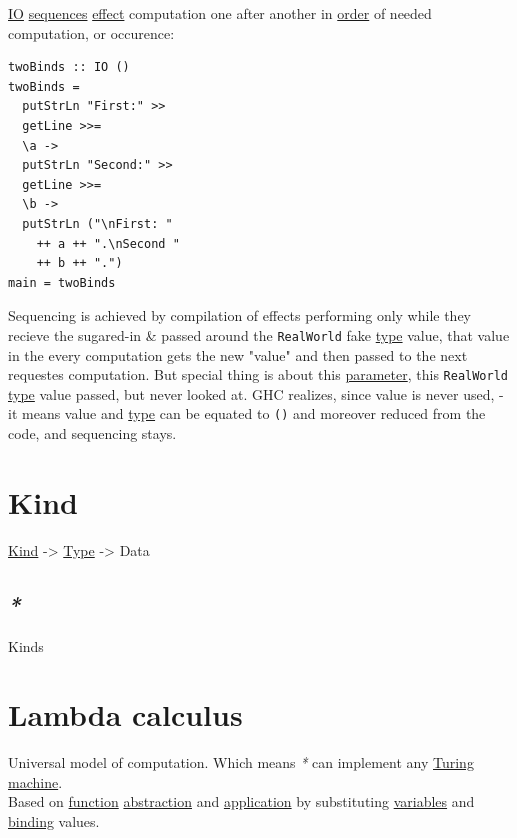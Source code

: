 \documentclass[a4paper,14pt,oneside]{book}
\begin{document}
\hyperref[org786f026]{IO} \hyperref[org581f8c7]{sequences} \hyperref[org7897fca]{effect} computation one after another in \hyperref[org1313c5f]{order} of needed computation, or occurence:\\

\begin{verbatim}
twoBinds :: IO ()
twoBinds =
  putStrLn "First:" >>
  getLine >>=
  \a ->
  putStrLn "Second:" >>
  getLine >>=
  \b ->
  putStrLn ("\nFirst: "
    ++ a ++ ".\nSecond "
    ++ b ++ ".")
main = twoBinds
\end{verbatim}

Sequencing is achieved by compilation of effects performing only while they recieve the sugared-in \& passed around the \texttt{RealWorld} fake \hyperref[orgdbcea73]{type} value, that value in the every computation gets the new "value" and then passed to the next requestes computation. But special thing is about this \hyperref[orga2e5d96]{parameter}, this \texttt{RealWorld} \hyperref[orgdbcea73]{type} value passed, but never looked at. GHC realizes, since value is never used, - it means value and \hyperref[orgdbcea73]{type} can be equated to \texttt{()} and moreover reduced from the code, and sequencing stays.\\

\chapter{\label{orgfd91f52}Kind}
\label{sec:org0ef9187}
\hyperref[orgfd91f52]{Kind} -> \hyperref[orgdbcea73]{Type} -> Data\\

\section{\emph{*}}
\label{sec:orgeb5cdbe}

\label{org52576a1}Kinds\\

\chapter{\label{org64d7489}Lambda calculus}
\label{sec:org65a1623}
Universal model of computation. Which means \emph{*} can implement any \hyperref[org2094b21]{Turing machine}.\\
Based on \hyperref[org39271b2]{function} \hyperref[org8f8916c]{abstraction} and \hyperref[org1793e06]{application} by substituting \hyperref[org1f76999]{variables} and \hyperref[org73123b0]{binding} values.\\
\end{document}
